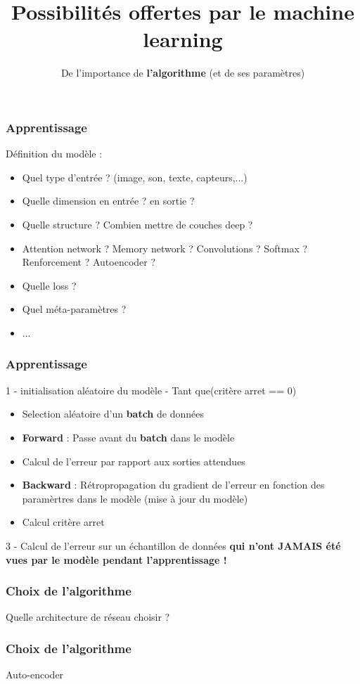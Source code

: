 \documentclass{formation}
\title{Possibilités offertes par le machine learning}
\subtitle{De l'importance de \textbf{l'algorithme} (et de ses paramètres)}
\begin{document}
\maketitle

\begin{frame}
  \frametitle{Apprentissage}
  Définition du modèle :
  \begin{itemize}
  \item Quel type d'entrée ? (image, son, texte, capteurs,...)
  \item Quelle dimension en entrée ? en sortie ?
  \item Quelle structure ? Combien mettre de couches deep ?
  \item Attention network ? Memory network ? Convolutions ? Softmax ? Renforcement ? Autoencoder ? 
  \item Quelle loss ?
  \item Quel méta-paramètres ?
  \item ...
  \end{itemize}
\end{frame}

\begin{frame}
  \frametitle{Apprentissage}
  1 - initialisation aléatoire du modèle
   - Tant que(critère arret == 0)
  \begin{itemize}
  \item Selection aléatoire d'un \textbf{batch} de données
  \item \textbf{Forward} : Passe avant du \textbf{batch} dans le modèle
  \item Calcul de l'erreur par rapport aux sorties attendues
  \item \textbf{Backward} : Rétropropagation du gradient de l'erreur en fonction des paramèrtres dans le modèle (mise à jour du modèle)
  \item Calcul critère arret
  \end{itemize}
  3 - Calcul de l'erreur sur un échantillon de données  \textbf{qui n'ont JAMAIS été vues par le modèle pendant l'apprentissage !}
\end{frame}

\begin{frame}
  \frametitle{Choix de l'algorithme}
  \begin{center}
    \huge{Quelle architecture de réseau choisir ?}
  \end{center}
\end{frame}

\begin{frame}
  \frametitle{Choix de l'algorithme}
  Auto-encoder
\end{frame}
\end{document}
